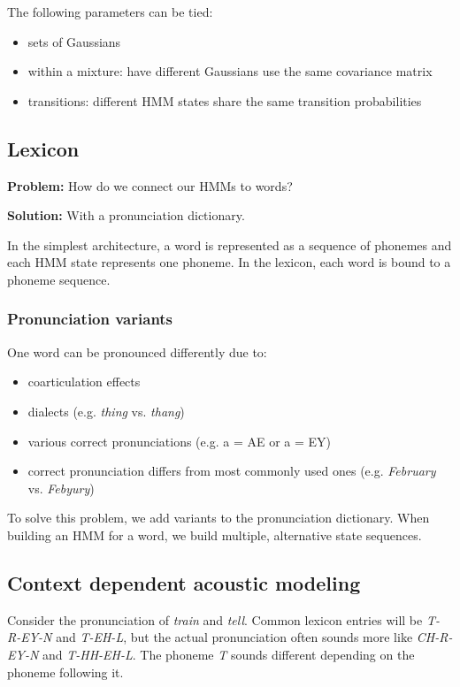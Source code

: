 \documentclass[11pt]{article}
\begin{document}
The following parameters can be tied:
\begin{itemize}
    \item sets of Gaussians
    \item within a mixture: have different Gaussians use the same covariance matrix
    \item transitions: different HMM states share the same transition probabilities
\end{itemize}

\subsection{Lexicon}

\textbf{Problem:} How do we connect our HMMs to words?

\vspace{5pt}

\textbf{Solution:} With a pronunciation dictionary.

\vspace{10pt}

In the simplest architecture, a word is represented as a sequence of phonemes and each HMM state represents one phoneme. In the lexicon, each word is bound to a phoneme sequence.

\subsubsection{Pronunciation variants}

One word can be pronounced differently due to:
\begin{itemize}
    \item coarticulation effects
    \item dialects (e.g. \textit{thing} vs. \textit{thang})
    \item various correct pronunciations (e.g. a = AE or a = EY)
    \item correct pronunciation differs from most commonly used ones (e.g. \textit{February} vs. \textit{Febyury})
\end{itemize}
To solve this problem, we add variants to the pronunciation dictionary. When building an HMM for a word, we build multiple, alternative state sequences.

\subsection{Context dependent acoustic modeling}

Consider the pronunciation of \textit{train} and \textit{tell}. Common lexicon entries will be \textit{T-R-EY-N} and \textit{T-EH-L}, but the actual pronunciation often sounds more like \textit{CH-R-EY-N} and \textit{T-HH-EH-L}. The phoneme \textit{T} sounds different depending on the phoneme following it.
\end{document}
